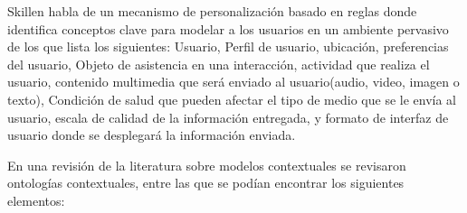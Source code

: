 Skillen \cite{Skillen201497} habla de un mecanismo de personalizaci\'on basado en reglas donde identifica conceptos clave para modelar a los usuarios en un ambiente pervasivo de los que lista los siguientes: Usuario, Perfil de usuario, ubicaci\'on, preferencias del usuario, Objeto de asistencia en una interacci\'on, actividad que realiza el usuario, contenido multimedia que ser\'a enviado al usuario(audio, video, imagen o texto), Condici\'on de salud que pueden afectar el tipo de medio que se le env\'ia al usuario, escala de calidad de la informaci\'on entregada, y formato de interfaz de usuario donde se desplegar\'a la informaci\'on enviada.

En una revisi\'on de la literatura sobre modelos contextuales se revisaron ontolog\'ias contextuales, entre las que se pod\'ian encontrar los siguientes elementos:

